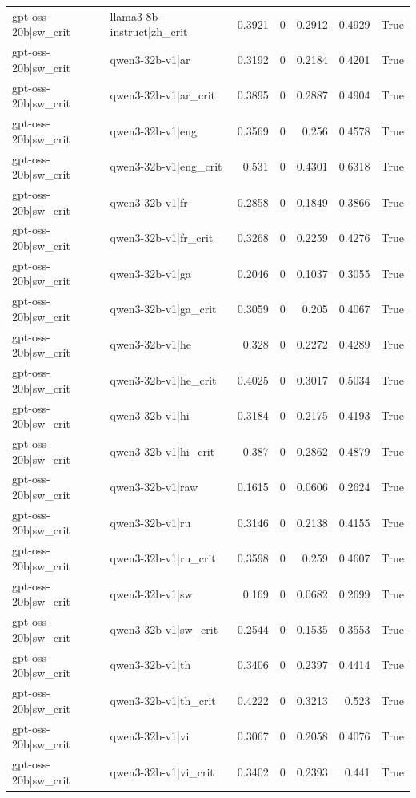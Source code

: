 \begin{table}
\begin{tabular}{l l r r r r l}
gpt-oss-20b|sw_crit & llama3-8b-instruct|zh_crit & 0.3921 & 0 & 0.2912 & 0.4929 & True \\
gpt-oss-20b|sw_crit & qwen3-32b-v1|ar & 0.3192 & 0 & 0.2184 & 0.4201 & True \\
gpt-oss-20b|sw_crit & qwen3-32b-v1|ar_crit & 0.3895 & 0 & 0.2887 & 0.4904 & True \\
gpt-oss-20b|sw_crit & qwen3-32b-v1|eng & 0.3569 & 0 & 0.256 & 0.4578 & True \\
gpt-oss-20b|sw_crit & qwen3-32b-v1|eng_crit & 0.531 & 0 & 0.4301 & 0.6318 & True \\
gpt-oss-20b|sw_crit & qwen3-32b-v1|fr & 0.2858 & 0 & 0.1849 & 0.3866 & True \\
gpt-oss-20b|sw_crit & qwen3-32b-v1|fr_crit & 0.3268 & 0 & 0.2259 & 0.4276 & True \\
gpt-oss-20b|sw_crit & qwen3-32b-v1|ga & 0.2046 & 0 & 0.1037 & 0.3055 & True \\
gpt-oss-20b|sw_crit & qwen3-32b-v1|ga_crit & 0.3059 & 0 & 0.205 & 0.4067 & True \\
gpt-oss-20b|sw_crit & qwen3-32b-v1|he & 0.328 & 0 & 0.2272 & 0.4289 & True \\
gpt-oss-20b|sw_crit & qwen3-32b-v1|he_crit & 0.4025 & 0 & 0.3017 & 0.5034 & True \\
gpt-oss-20b|sw_crit & qwen3-32b-v1|hi & 0.3184 & 0 & 0.2175 & 0.4193 & True \\
gpt-oss-20b|sw_crit & qwen3-32b-v1|hi_crit & 0.387 & 0 & 0.2862 & 0.4879 & True \\
gpt-oss-20b|sw_crit & qwen3-32b-v1|raw & 0.1615 & 0 & 0.0606 & 0.2624 & True \\
gpt-oss-20b|sw_crit & qwen3-32b-v1|ru & 0.3146 & 0 & 0.2138 & 0.4155 & True \\
gpt-oss-20b|sw_crit & qwen3-32b-v1|ru_crit & 0.3598 & 0 & 0.259 & 0.4607 & True \\
gpt-oss-20b|sw_crit & qwen3-32b-v1|sw & 0.169 & 0 & 0.0682 & 0.2699 & True \\
gpt-oss-20b|sw_crit & qwen3-32b-v1|sw_crit & 0.2544 & 0 & 0.1535 & 0.3553 & True \\
gpt-oss-20b|sw_crit & qwen3-32b-v1|th & 0.3406 & 0 & 0.2397 & 0.4414 & True \\
gpt-oss-20b|sw_crit & qwen3-32b-v1|th_crit & 0.4222 & 0 & 0.3213 & 0.523 & True \\
gpt-oss-20b|sw_crit & qwen3-32b-v1|vi & 0.3067 & 0 & 0.2058 & 0.4076 & True \\
gpt-oss-20b|sw_crit & qwen3-32b-v1|vi_crit & 0.3402 & 0 & 0.2393 & 0.441 & True \\

\end{tabular}
\end{table}
